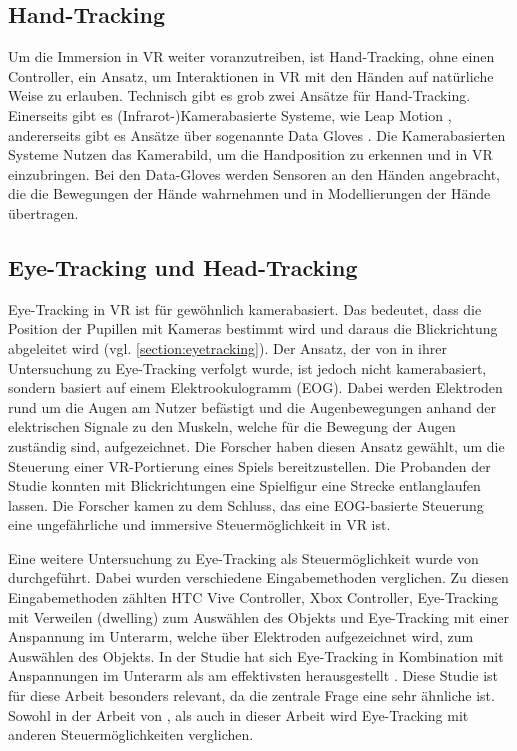 \subsection{Hand-Tracking}
Um die Immersion in VR weiter voranzutreiben, ist Hand-Tracking, ohne einen Controller, ein Ansatz, um Interaktionen in VR mit den Händen auf natürliche Weise zu erlauben. 
Technisch gibt es grob zwei Ansätze für Hand-Tracking. Einerseits gibt es (Infrarot-)Kamerabasierte Systeme, wie Leap Motion \cite{Leap.2014}, andererseits gibt es Ansätze über sogenannte Data Gloves \cite{S.Lee.2017}. Die Kamerabasierten Systeme Nutzen das Kamerabild, um die Handposition zu erkennen und in VR einzubringen. Bei den Data-Gloves werden Sensoren an den Händen angebracht, die die Bewegungen der Hände wahrnehmen und in Modellierungen der Hände übertragen. 

\subsection{Eye-Tracking und Head-Tracking}
\label{eyetrackingVR}
Eye-Tracking in VR ist für gewöhnlich kamerabasiert. Das bedeutet, dass die Position der Pupillen mit Kameras bestimmt wird und daraus die Blickrichtung abgeleitet wird (vgl. \autoref{section:eyetracking}). Der Ansatz, der von \citeauthor{D.Kumar.2016} in ihrer Untersuchung zu Eye-Tracking verfolgt wurde, ist jedoch nicht kamerabasiert, sondern basiert auf einem Elektrookulogramm (EOG). Dabei werden Elektroden rund um die Augen am Nutzer befästigt und die Augenbewegungen anhand der elektrischen Signale zu den Muskeln, welche für die Bewegung der Augen zuständig sind, aufgezeichnet. Die Forscher haben diesen Ansatz gewählt, um die Steuerung einer VR-Portierung eines Spiels bereitzustellen. Die Probanden der Studie konnten mit Blickrichtungen eine Spielfigur eine Strecke entlanglaufen lassen. Die Forscher kamen zu dem Schluss, das eine EOG-basierte Steuerung eine ungefährliche und immersive Steuermöglichkeit in VR ist.\cite{D.Kumar.2016}

Eine weitere Untersuchung zu Eye-Tracking als Steuermöglichkeit wurde von \citeauthor{Pai.2019} durchgeführt. Dabei wurden verschiedene Eingabemethoden verglichen. Zu diesen Eingabemethoden zählten HTC Vive Controller, Xbox Controller, Eye-Tracking mit Verweilen (dwelling) zum Auswählen des Objekts und Eye-Tracking mit einer Anspannung im Unterarm, welche über Elektroden aufgezeichnet wird, zum Auswählen des Objekts. In der Studie hat sich Eye-Tracking in Kombination mit Anspannungen im Unterarm als am effektivsten herausgestellt \cite{Pai.2019}. Diese Studie ist für diese Arbeit besonders relevant, da die zentrale Frage eine sehr ähnliche ist. Sowohl in der Arbeit von \citeauthor{Pai.2019}, als auch in dieser Arbeit wird Eye-Tracking mit anderen Steuermöglichkeiten verglichen.

